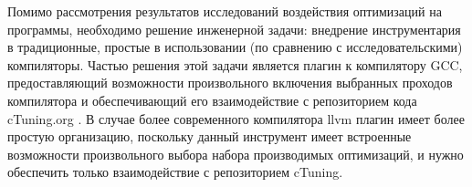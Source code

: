 Помимо рассмотрения результатов исследований воздействия оптимизаций на программы, необходимо решение инженерной задачи: внедрение инструментария в традиционные, простые в использовании (по сравнению с исследовательскими) компиляторы. Частью решения этой задачи является плагин к компилятору GCC, предоставляющий возможности произвольного включения выбранных проходов компилятора и обеспечивающий его взаимодействие с репозиторием кода cTuning.org \cite{Fur2009}. В случае более современного компилятора llvm \cite{llvm} плагин имеет более простую организацию, поскольку данный инструмент имеет встроенные возможности произвольного выбора набора производимых оптимизаций, и нужно обеспечить только взаимодействие с репозиторием cTuning.